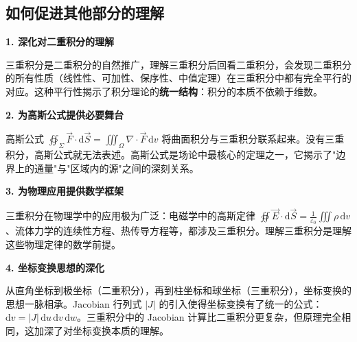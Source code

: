 \subsection{如何促进其他部分的理解}

\begin{connectionbox}
\textbf{1. 深化对二重积分的理解}

三重积分是二重积分的自然推广，理解三重积分后回看二重积分，会发现二重积分的所有性质（线性性、可加性、保序性、中值定理）在三重积分中都有完全平行的对应。这种平行性揭示了积分理论的\textbf{统一结构}：积分的本质不依赖于维数。

\textbf{2. 为高斯公式提供必要舞台}

高斯公式 $\oiint_\Sigma \vec{F}\cdot\mathrm{d}\vec{S} = \iiint_\Omega \nabla\cdot\vec{F}\,\mathrm{d}v$ 将曲面积分与三重积分联系起来。没有三重积分，高斯公式就无法表述。高斯公式是场论中最核心的定理之一，它揭示了"边界上的通量"与"区域内的源"之间的深刻关系。

\textbf{3. 为物理应用提供数学框架}

三重积分在物理学中的应用极为广泛：电磁学中的高斯定律 $\oiint \vec{E}\cdot\mathrm{d}\vec{S} = \frac{1}{\varepsilon_0}\iiint \rho\,\mathrm{d}v$、流体力学的连续性方程、热传导方程等，都涉及三重积分。理解三重积分是理解这些物理定律的数学前提。

\textbf{4. 坐标变换思想的深化}

从直角坐标到极坐标（二重积分），再到柱坐标和球坐标（三重积分），坐标变换的思想一脉相承。Jacobian 行列式 $|J|$ 的引入使得坐标变换有了统一的公式：$\mathrm{d}v = |J|\,\mathrm{d}u\,\mathrm{d}v\,\mathrm{d}w$。三重积分中的 Jacobian 计算比二重积分更复杂，但原理完全相同，这加深了对坐标变换本质的理解。
\end{connectionbox}

